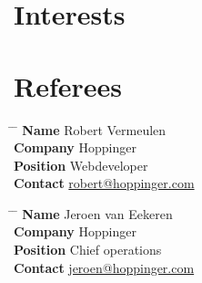 \documentclass[10pt]{article} %
\begin{document}
\newpage


\section{Interests}



 \section{Referees}

 \begin{tabbing}
 \hspace{2.75cm} \= \hspace{4cm} \= \kill %
 {\bf Name} \> Robert Vermeulen\\ %
 {\bf Company} \> Hoppinger \\ %
 {\bf Position} \> Webdeveloper\\ %
 {\bf Contact} \> \href{mailto:robert@hoppinger.com}{robert@hoppinger.com} %
 \end{tabbing}

 \begin{tabbing}
 \hspace{2.75cm} \= \hspace{4cm} \= \kill %
 {\bf Name} \> Jeroen van Eekeren \\ %
 {\bf Company} \> Hoppinger \\ %
 {\bf Position} \>  Chief operations \\ %
 {\bf Contact} \> \href{mailto:jeroen@hoppinger.com}{jeroen@hoppinger.com} \\ %
 \end{tabbing}

\end{document}
